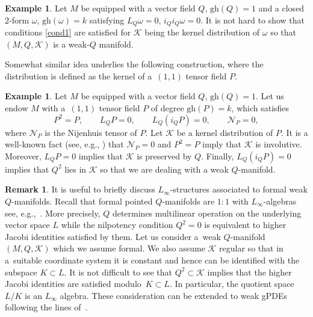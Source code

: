 \documentclass[10pt,a4paper]{amsart}
\numberwithin{equation}{section}
\theoremstyle{definition}
\newtheorem{Example}[Theorem]{Example}
\newtheorem{Remark}[Theorem]{Remark}
\newcommand{\changed}[1]{{#1}}
\newcommand{\gh}[1]{\mathrm{gh}(#1)}
\def\cK{\mathcal{K}}
\def\cN{\mathcal{N}}
\begin{document}
\begin{Example}%
 Let $M$ be equipped with a vector field $Q$, $\gh{Q}=1$ and a closed 2-form $\omega$, $\gh{\omega}=k$ satisfying $L_Q\omega=0$, $i_Qi_Q\omega=0$. It is not hard to show that conditions \eqref{cond1} are satisfied for $\cK$ being the kernel distribution of $\omega$ so that $(M,Q,\cK)$ is a weak-$Q$ manifold.
\end{Example}
Somewhat similar idea underlies the following construction, where the distribution is defined as the kernel of a~$(1,1)$ tensor field $P$.
\begin{Example} \label{ex:projector}
 Let $M$ be equipped with a vector field $Q$, $\gh{Q}=1$. Let us endow $M$ with a~$(1,1)$ tensor field $P$ of degree $\gh{P}=k$, which satisfies
 \begin{equation*}%
 P^2=P, \qquad L_QP=0,\qquad L_Q(i_QP)=0, \qquad \cN_P=0,
 \end{equation*}
 where $ \cN_P$ is the Nijenhuis tensor of $P$. Let $\mathcal{K}$ be a kernel distribution of $P$. It is a well-known fact (see, e.g., \cite{Kobayashi:1962a}) that $\cN_P=0$ and $P^2=P$ imply that $\mathcal{K}$ is involutive. Moreover, $L_QP=0$ implies that $\cK$ is preserved by $Q$. Finally, $L_Q(i_QP)=0$ implies that $Q^2$ lies in $\mathcal{K}$ so that we are dealing with a weak $Q$-manifold.
\end{Example}

\begin{Remark}
 It is useful to briefly discuss $L_{\infty}$-structures associated to formal weak $Q$-manifolds. Recall that formal pointed $Q$-manifolds are $1:1$ with $L_\infty$-algebras \changed{see, e.g.,~\cite{Alexandrov:1995kv,Kontsevich:1997vb}}. More precisely, $Q$ determines multilinear operation on the underlying vector space $L$ while the nilpotency condition $Q^2=0$ is equivalent to higher Jacobi identities satisfied by them. Let us consider a~weak $Q$-manifold $(M,Q,\mathcal{K})$ which we assume formal. We also assume $\cK$ regular so that in a~suitable coordinate system it is constant and hence can be identified with the subspace $K\subset L$. It is not difficult to see that $Q^2\subset \cK$ implies that the higher Jacobi identities are satisfied modulo~${K\subset L}$. In particular, the quotient space $L/K$ is an $L_\infty$ algebra. These consideration can be extended to weak gPDEs following the lines of~\cite{Grigoriev:2023lcc}.
\end{Remark}
\end{document}
